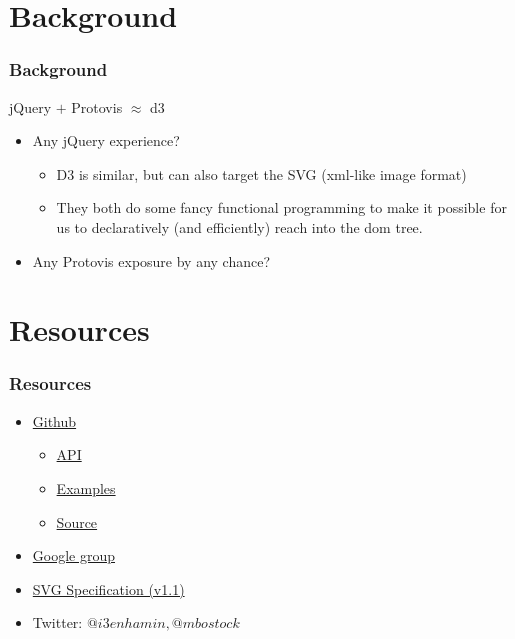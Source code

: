 \documentclass{beamer}
\begin{document}
\section{Background}

\begin{frame}
    \frametitle{Background}
    \begin{block}{jQuery $+$ Protovis $\approx$ d3}
        \begin{itemize}
        \item Any jQuery experience?
        \pause
            \begin{itemize}
            \item D3 is similar, but can also target the SVG (xml-like image format)
        \pause
            \item They both do some fancy functional programming to make it possible 
                  for us to declaratively (and efficiently) reach into the dom tree.
            \end{itemize}
        \pause
        \item Any Protovis exposure by any chance?
       \end{itemize}
    \end{block}
\end{frame}


\section{Resources}


\begin{frame}
    \frametitle{Resources}
        \begin{itemize}
        \item \href{http://mbostock.github.com/d3/}{Github}
            \begin{itemize}
            \item \href{https://github.com/mbostock/d3/wiki/API-Reference}{API}
            \item \href{http://mbostock.github.com/d3/ex/}{Examples}
            \item \href{https://github.com/mbostock/d3.git}{Source}
            \end{itemize}
        \item \href{http://groups.google.com/group/d3-js?pli=1}{Google group}
        \item \href{http://www.w3.org/TR/SVG/}{SVG Specification (v1.1)}
        \item Twitter: $@i3enhamin, @mbostock$
        \end{itemize}
\end{frame}
\end{document}
